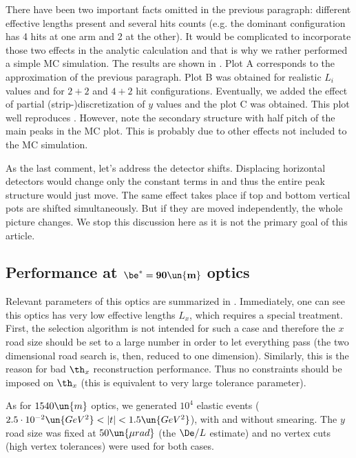 There have been two important facts omitted in the previous paragraph: different effective lengths present and several hits counts (e.g. the dominant configuration has 4 hits at one arm and 2 at the other). It would be complicated to incorporate those two effects in the analytic calculation and that is why we rather performed a simple MC simulation. The results are shown in . Plot A corresponds to the approximation of the previous paragraph. Plot B was obtained for realistic $L_i$ values and for $2+2$ and $4+2$ hit configurations. Eventually, we added the effect of partial (strip-)discretization of $y$ values and the plot C was obtained. This plot well reproduces . However, note the secondary structure with half pitch of the main peaks in the MC plot. This is probably due to other effects not included to the MC simulation.

As the last comment, let's address the detector shifts. Displacing horizontal detectors would change only the constant terms in  and thus the entire peak structure would just move. The same effect takes place if top and bottom vertical pots are shifted simultaneously. But if they are moved independently, the whole picture changes. We stop this discussion here as it is not the primary goal of this article.






\subsection[90]{Performance at $\mathbf{\be^* = 90\un{m}}$ optics}

Relevant parameters of this optics are summarized in . Immediately, one can see this optics has very low effective lengths $L_x$, which requires a special treatment. First, the selection algorithm is not intended for such a case and therefore the $x$ road size should be set to a large number in order to let everything pass (the two dimensional road search is, then, reduced to one dimension). Similarly, this is the reason for bad $\th_x$ reconstruction performance. Thus no constraints should be imposed on $\th_x$ (this is equivalent to very large tolerance parameter).

As for $1540\un{m}$ optics, we generated $10^4$ elastic events ($2.5\cdot10^{-2}\un{GeV^2} < |t| < 1.5\un{GeV^2}$), with and without smearing. The $y$ road size was fixed at $50\un{\mu rad}$ (the $\De/L$ estimate) and no vertex cuts (high vertex tolerances) were used for both cases.

